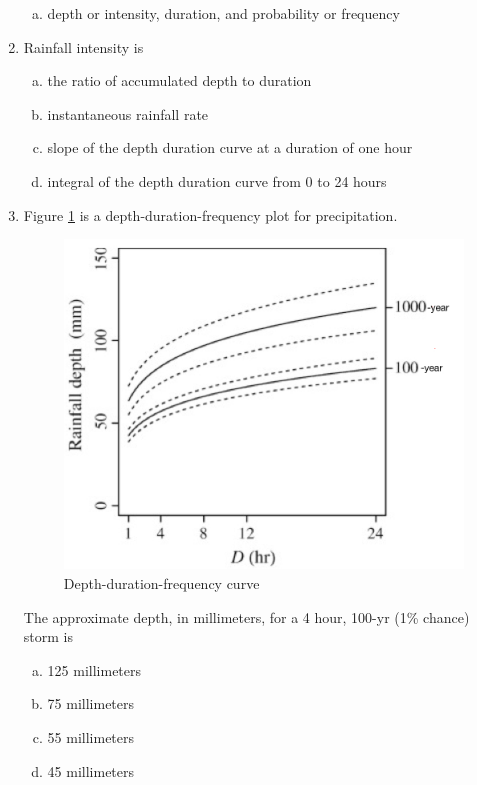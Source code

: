 \documentclass[12pt]{article}
\begin{document}
\begin{enumerate}
\begin{enumerate}[a)]
\item depth or intensity, duration, and probability or frequency
\end{enumerate}
\item Rainfall intensity is 
\begin{enumerate}[a)]
\item the ratio of accumulated depth to duration
\item instantaneous rainfall rate
\item slope of the depth duration curve at a duration of one hour
\item integral of the depth duration curve from 0 to 24 hours
\end{enumerate}

\newpage
\item Figure \ref{fig:ddf-curve.jpg} is a depth-duration-frequency plot for precipitation.

\begin{figure}[h!] %
   \centering
   \includegraphics[width=6in]{ddf-curve.jpg} 
   \caption{Depth-duration-frequency curve}
   \label{fig:ddf-curve.jpg}
\end{figure}

The approximate depth, in millimeters, for a 4 hour, 100-yr (1\% chance) storm is 
\begin{enumerate}[a)]
\item 125 millimeters
\item 75 millimeters
\item 55 millimeters
\item 45 millimeters
\end{enumerate}
\clearpage




\end{enumerate}
\end{document}
